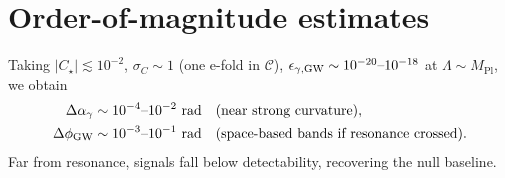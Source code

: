 \documentclass[%
 reprint,
 amsmath,amssymb,
 aps,
 pra,
 longbibliography,
 nofootinbib
]{revtex4-2}
\newcommand{\Mpl}{M_{\mathrm{Pl}}}
\begin{document}
\section{Order-of-magnitude estimates}
\label{sec:oome}
Taking $|C_\star|\lesssim 10^{-2}$, $\sigma_C\sim 1$ (one e-fold in $\mathcal{C}$), $\epsilon_{\gamma,\rm GW}\sim 10^{-20}\text{--}10^{-18}$ at $\Lambda\sim \Mpl$, we obtain
\begin{align}
\Delta\alpha_\gamma &\sim 10^{-4}\text{–}10^{-2}\ \mathrm{rad} \quad(\text{near strong curvature}),\\
\Delta\phi_{\rm GW} &\sim 10^{-3}\text{–}10^{-1}\ \mathrm{rad}
\quad(\text{space-based bands if resonance crossed}).
\end{align}
Far from resonance, signals fall below detectability, recovering the null baseline.
\end{document}
